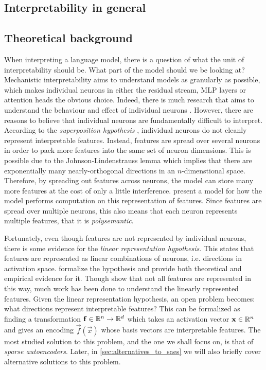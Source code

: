 \documentclass[../../main.tex]{subfiles}
\begin{document}
\subsection{Interpretability in general}



\subsection{Theoretical background}
When interpreting a language model, there is a question of what the unit of interpretability should be.
What part of the model should we be looking at?
Mechanistic interpretability aims to understand models as granularly as possible, which makes individual neurons in either the residual stream, MLP layers or attention heads the obvious choice.
Indeed, there is much research that aims to understand the behaviour and effect of individual neurons \citep{foote_neuron_2023}\citep{bills_language_2023}.
However, there are reasons to believe that individual neurons are fundamentally difficult to interpret.
According to the \emph{superposition hypothesis} \citep{elhage_toy_2022}, individual neurons do not cleanly represent interpretable features.
Instead, features are spread over several neurons in order to pack more features into the same set of neuron dimensions.
This is possible due to the Johnson-Lindenstrauss lemma which implies that there are exponentially many nearly-orthogonal directions in an $n$-dimenstional space.
Therefore, by spreading out features across neurons, the model can store many more features at the cost of only a little interference.
\citet{vaintrob_toward_2024} present a model for how the model performs computation on this representation of features.
Since features are spread over multiple neurons, this also means that each neuron represents multiple features, that it is \emph{polysemantic}.

Fortunately, even though features are not represented by individual neurons, there is some evidence for the \emph{linear representation hypothesis}.
This states that features are represented as linear combinations of neurons, i.e. directions in activation space.
\citet{park_linear_2023} formalize the hypothesis and provide both theoretical and empirical evidence for it.
Though \citet{engels_not_2024} show that not all features are represented in this way, much work has been done to understand the linearly represented features.
Given the linear representation hypothesis, an open problem becomes: what directions represent interpretable features?
This can be formalized as finding a transformation $\mathbf{f}\in\mathbb{R}^n\to\mathbb{R}^d$ which takes an activation vector $\mathbf{x}\in\mathbb{R}^n$ and gives an encoding $\vec f(\vec x)$ whose basis vectors are interpretable features.
The most studied solution to this problem, and the one we shall focus on, is that of \emph{sparse autoencoders}.
Later, in \ref{sec:alternatives_to_saes} we will also briefly cover alternative solutions to this problem.
\end{document}
